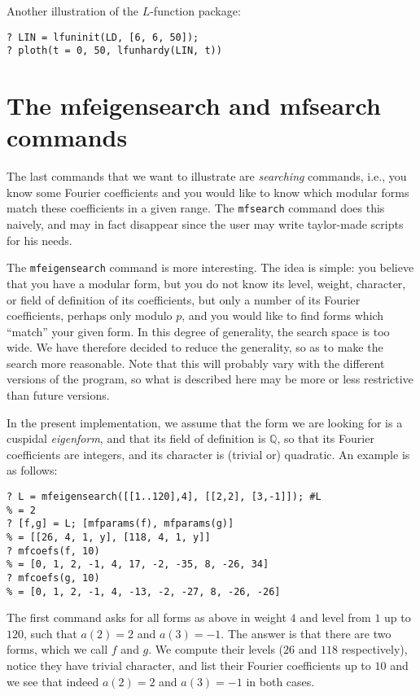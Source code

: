 \documentclass[11pt]{article}
\newcommand{\Q}{{\mathbb Q}}
\def\kbd#1{{\tt #1}}
\begin{document}
Another illustration of the $L$-function package:

\begin{verbatim}
? LIN = lfuninit(LD, [6, 6, 50]);
? ploth(t = 0, 50, lfunhardy(LIN, t))
\end{verbatim}


\medskip

\section{The mfeigensearch and mfsearch commands}

The last commands that we want to illustrate are \emph{searching} commands,
i.e., you know some Fourier coefficients and you would like to know which
modular forms match these coefficients in a given range. The
\kbd{mfsearch} command does this naively, and may in fact disappear
since the user may write taylor-made scripts for his needs.

The \kbd{mfeigensearch} command is more interesting. The idea is simple: you
believe that you have a modular form, but you do not know its level, weight,
character, or field of definition of its coefficients, but only a number of
its Fourier coefficients, perhaps only modulo $p$, and you would like to find
forms which ``match'' your given form. In this degree of generality, the
search space is too wide. We have therefore decided to reduce the generality,
so as to make the search more reasonable. Note that this will probably vary
with the different versions of the program, so what is described here may be
more or less restrictive than future versions.

In the present implementation, we assume that the form we are looking
for is a cuspidal \emph{eigenform}, and that its field of definition is $\Q$,
so that its Fourier coefficients are integers, and its character is
(trivial or) quadratic. An example is as follows:

\begin{verbatim}
? L = mfeigensearch([[1..120],4], [[2,2], [3,-1]]); #L
% = 2
? [f,g] = L; [mfparams(f), mfparams(g)]
% = [[26, 4, 1, y], [118, 4, 1, y]]
? mfcoefs(f, 10)
% = [0, 1, 2, -1, 4, 17, -2, -35, 8, -26, 34]
? mfcoefs(g, 10)
% = [0, 1, 2, -1, 4, -13, -2, -27, 8, -26, -26]
\end{verbatim}

The first command asks for all forms as above in weight $4$ and level from
$1$ up to $120$, such that $a(2)=2$ and $a(3)=-1$. The answer is that there
are two forms, which we call $f$ and $g$. We compute their levels ($26$ and
$118$ respectively), notice they have trivial character, and list their
Fourier coefficients up to $10$ and we see that indeed $a(2)=2$ and $a(3)=-1$
in both cases.
\end{document}
